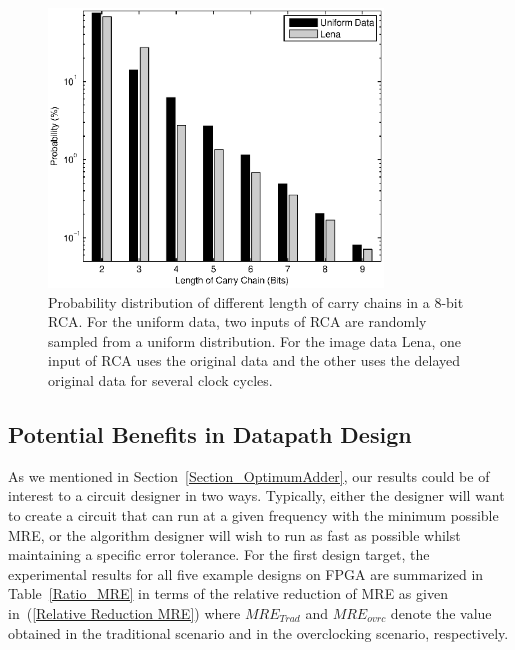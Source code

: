 \documentclass[journal]{IEEEtran}
\begin{document}
\begin{figure}[tbp]
  \centering
  \includegraphics[width=3.5in]{./Figures/CC_length2.eps}
  \caption{Probability distribution of different length of carry chains in a 8-bit RCA. For the uniform data, two inputs of RCA are randomly sampled from a uniform distribution. For the image data Lena, one input of RCA uses the original data and the other uses the delayed original data for several clock cycles.}
  \label{CarryDistribution}
\end{figure}



\subsection{Potential Benefits in Datapath Design}
As we mentioned in Section~\ref{Section_OptimumAdder}, our results could be of interest to a circuit designer in two ways. Typically, either the designer will want to create a circuit that can run at a given frequency with the minimum possible MRE, or the algorithm designer will wish to run as fast as possible whilst maintaining a specific error tolerance. For the first design target, the experimental results for all five example designs on FPGA are summarized in Table~\ref{Ratio_MRE} in terms of the relative reduction of MRE as given in~(\ref{Relative Reduction MRE}) where $MRE_{Trad}$ and $MRE_{ovrc}$ denote the value obtained in the traditional scenario and in the overclocking scenario, respectively.
\end{document}
